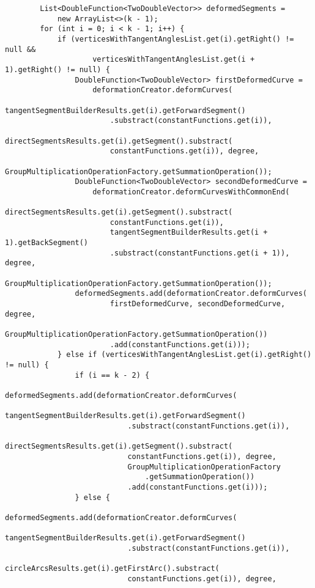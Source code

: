 \begin{verbatim}
        List<DoubleFunction<TwoDoubleVector>> deformedSegments =
            new ArrayList<>(k - 1);
        for (int i = 0; i < k - 1; i++) {
            if (verticesWithTangentAnglesList.get(i).getRight() != null &&
                    verticesWithTangentAnglesList.get(i + 1).getRight() != null) {
                DoubleFunction<TwoDoubleVector> firstDeformedCurve =
                    deformationCreator.deformCurves(
                        tangentSegmentBuilderResults.get(i).getForwardSegment()
                        .substract(constantFunctions.get(i)),
                        directSegmentsResults.get(i).getSegment().substract(
                        constantFunctions.get(i)), degree,
                        GroupMultiplicationOperationFactory.getSummationOperation());
                DoubleFunction<TwoDoubleVector> secondDeformedCurve =
                    deformationCreator.deformCurvesWithCommonEnd(
                        directSegmentsResults.get(i).getSegment().substract(
                        constantFunctions.get(i)),
                        tangentSegmentBuilderResults.get(i + 1).getBackSegment()
                        .substract(constantFunctions.get(i + 1)), degree,
                        GroupMultiplicationOperationFactory.getSummationOperation());
                deformedSegments.add(deformationCreator.deformCurves(
                        firstDeformedCurve, secondDeformedCurve, degree,
                        GroupMultiplicationOperationFactory.getSummationOperation())
                        .add(constantFunctions.get(i)));
            } else if (verticesWithTangentAnglesList.get(i).getRight() != null) {
                if (i == k - 2) {
                    deformedSegments.add(deformationCreator.deformCurves(
                            tangentSegmentBuilderResults.get(i).getForwardSegment()
                            .substract(constantFunctions.get(i)),
                            directSegmentsResults.get(i).getSegment().substract(
                            constantFunctions.get(i)), degree,
                            GroupMultiplicationOperationFactory
                                .getSummationOperation())
                            .add(constantFunctions.get(i)));
                } else {
                    deformedSegments.add(deformationCreator.deformCurves(
                            tangentSegmentBuilderResults.get(i).getForwardSegment()
                            .substract(constantFunctions.get(i)),
                            circleArcsResults.get(i).getFirstArc().substract(
                            constantFunctions.get(i)), degree,

\end{verbatim}
